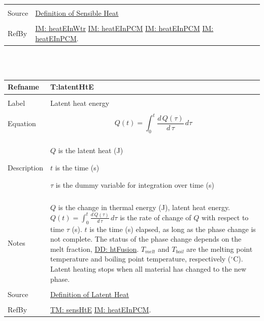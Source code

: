 \documentclass[12pt]{article}
\begin{document}
\begin{minipage}{\textwidth}
\begin{tabular}{p{} p{}}
\\ \midrule \\
Source & \hyperref[http://en.wikipedia.org/wiki/Sensible_heat]{Definition of Sensible Heat}
\\ \midrule \\
RefBy & \hyperref[IM:heatEInWtr]{IM: heatEInWtr} \hyperref[IM:heatEInPCM]{IM: heatEInPCM} \hyperref[IM:heatEInPCM]{IM: heatEInPCM} \hyperref[IM:heatEInPCM]{IM: heatEInPCM}.
\\ \bottomrule \end{tabular}
\end{minipage}\\
~\newline
\noindent \begin{minipage}{\textwidth}
\begin{tabular}{p{} p{}}
\toprule \textbf{Refname} & \textbf{T:latentHtE}
\label{T:latentHtE}
\\ \midrule \\
Label & Latent heat energy
\\ \midrule \\
Equation & \begin{dmath}
           Q\left(t\right)=\int_{0}^{t}{\frac{d\,Q\left(τ\right)}{d\,τ}}\,dτ
           \end{dmath}
\\ \midrule \\
Description & \begin{symbDescription}
              \item{$Q$ is the latent heat (J)}
              \item{$t$ is the time (s)}
              \item{$τ$ is the dummy variable for integration over time (s)}
              \end{symbDescription}
\\ \midrule \\
Notes & $Q$ is the change in thermal energy (J), latent heat energy. $Q\left(t\right)=\int_{0}^{t}{\frac{d\,Q\left(τ\right)}{d\,τ}}\,dτ$ is the rate of change of $Q$ with respect to time $τ$ (s). $t$ is the time (s) elapsed, as long as the phase change is not complete. The status of the phase change depends on the melt fraction, \hyperref[DD:htFusion]{DD: htFusion}. ${T_{melt}}$ and ${T_{boil}}$ are the melting point temperature and boiling point temperature, respectively (${}^{\circ}$C). Latent heating stops when all material has changed to the new phase.
\\ \midrule \\
Source & \hyperref[http://en.wikipedia.org/wiki/Latent_heat]{Definition of Latent Heat}
\\ \midrule \\
RefBy & \hyperref[T:sensHtE]{TM: sensHtE} \hyperref[IM:heatEInPCM]{IM: heatEInPCM}.
\\ \bottomrule \end{tabular}
\end{minipage}\\
\end{document}
